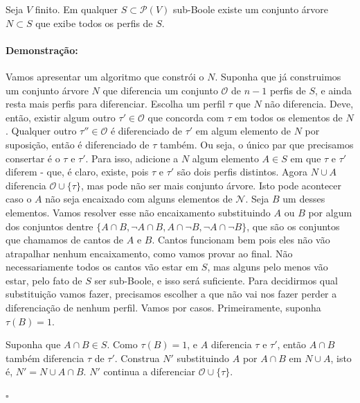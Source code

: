\documentclass[11pt]{article}
\newcommand{\pulinho}{\vspace{.5cm}}
\theoremstyle{definition}
\theoremstyle{definition}
\newtheorem*{theorem*}{Teorema}
\newenvironment{teorema*}{
\definecolor{shadecolor}{HTML}{f59aa3}
\begin{shaded}
\begin{theorem*}
}
{
\end{theorem*}
\end{shaded}
}
\theoremstyle{definition}
\theoremstyle{definition}
\theoremstyle{definition}
\theoremstyle{definition}
\theoremstyle{definition}
\theoremstyle{definition}
\theoremstyle{definition}
\theoremstyle{definition}
\theoremstyle{definition}
\theoremstyle{definition}
\newenvironment{prova}{\paragraph{Demonstração:}}{\hfill$\square$ 
\pulinho
}
\theoremstyle{definition}
\theoremstyle{definition}
\begin{document}
\begin{teorema*}
  Seja $V$ finito. Em qualquer $S \subset \mathcal{P}(V)$ sub-Boole existe um conjunto árvore $N \subset S$ que exibe todos os perfis de $S$.
\end{teorema*}
\begin{prova}
Vamos apresentar um algoritmo que constrói o $N$. Suponha que já construimos um conjunto árvore $N$ que diferencia um conjunto $\mathcal{O}$ de $n -1$ perfis de $S$, e ainda resta mais perfis para diferenciar. Escolha um perfil $\tau$ que $N$ não diferencia. Deve, então, existir algum outro $\tau' \in \mathcal{O}$ que concorda com $\tau$ em todos os elementos de $N$. Qualquer outro $\tau'' \in \mathcal{O}$ é diferenciado de $\tau'$ em algum elemento de $N$ por suposição, então é diferenciado de $\tau$ também. Ou seja, o único par que precisamos consertar é o $\tau$ e $\tau'$. Para isso, adicione a $N$ algum elemento $A \in S$ em que $\tau$ e $\tau'$ diferem - que, é claro, existe, pois $\tau$ e $\tau'$ são dois perfis distintos. Agora $N \cup {A}$ diferencia $\mathcal{O} \cup \{\tau\}$, mas pode não ser mais conjunto árvore. Isto pode acontecer caso o $A$ não seja encaixado com alguns elementos de $\mathcal{N}$. Seja $B$ um desses elementos. Vamos resolver esse não encaixamento substituindo $A$ ou $B$ por algum dos conjuntos dentre $\{A \cap B, \lnot A \cap B, A \cap \lnot B, \lnot A \cap \lnot B\}$, que são os conjuntos que chamamos de cantos de $A$ e $B$. Cantos funcionam bem pois eles não vão atrapalhar nenhum encaixamento, como vamos provar ao final. Não necessariamente todos os cantos vão estar em $S$, mas alguns pelo menos vão estar, pelo fato de $S$ ser sub-Boole, e isso será suficiente.  Para decidirmos qual substituição vamos fazer, precisamos escolher a que não vai nos fazer perder a diferenciação de nenhum perfil. Vamos por casos. Primeiramente, suponha $\tau(B) = 1$.

Suponha que $A \cap B \in S$. Como $\tau(B) = 1$, e $A$ diferencia $\tau$ e $\tau'$, então $A \cap B$ também diferencia $\tau$ de $\tau'$. Construa $N'$ substituindo $A$ por $A\cap B$ em $N \cup {A}$, isto é, $N' = N \cup {A \cap B}$. $N'$ continua a diferenciar $\mathcal{O} \cup \{\tau\}$.


\end{prova}
\end{document}
